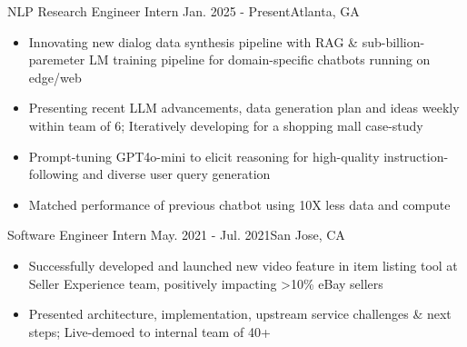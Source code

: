     {NLP Research Engineer Intern}
    {Jan. 2025 - Present}{Atlanta, GA}
\begin{itemize}
    \item Innovating new dialog data synthesis pipeline with RAG \& sub-billion-paremeter LM training pipeline for domain-specific chatbots running on edge/web

    \item Presenting recent LLM advancements, data generation plan and ideas weekly within team of 6; Iteratively developing for a shopping mall case-study

    \item Prompt-tuning GPT4o-mini to elicit reasoning for high-quality instruction-following and diverse user query generation


    \item Matched performance of previous chatbot using 10X less data and compute
\end{itemize}
\dividerSmall


    {Software Engineer Intern}
    {May. 2021 - Jul. 2021}{San Jose, CA}
\begin{itemize}

    \item Successfully developed and launched new video feature in item listing tool at Seller Experience team, positively impacting >10\% eBay sellers

    \item Presented architecture, implementation, upstream service challenges \& next steps; Live-demoed to internal team of 40+
\end{itemize}
\dividerSmall


